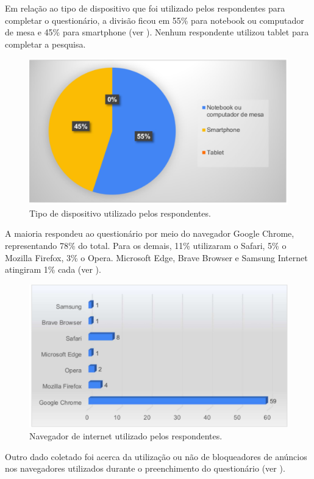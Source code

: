\documentclass[portuguese]{textolivre}
\begin{document}
Em relação ao tipo de dispositivo que foi utilizado pelos respondentes para completar o questionário, a divisão ficou em 55\% para notebook ou computador de mesa e 45\% para smartphone (ver ). Nenhum respondente utilizou tablet para completar a pesquisa.

\begin{figure}[h!]
    \centering
    \includegraphics[width=0.8\linewidth]{gra-002.pdf}
    \caption{Tipo de dispositivo utilizado pelos respondentes.}
    \label{fig10}
\end{figure}

A maioria respondeu ao questionário por meio do navegador Google Chrome, representando 78\% do total. Para os demais, 11\% utilizaram o Safari, 5\% o Mozilla Firefox, 3\% o Opera. Microsoft Edge, Brave Browser e Samsung Internet atingiram 1\% cada (ver ).

\begin{figure}[h!]
    \centering
    \includegraphics[width=0.8\linewidth]{gra-003.pdf}
    \caption{Navegador de internet utilizado pelos respondentes.}
    \label{fig11}
\end{figure}

Outro dado coletado foi acerca da utilização ou não de bloqueadores de anúncios nos navegadores utilizados durante o preenchimento do questionário (ver ).
\end{document}
